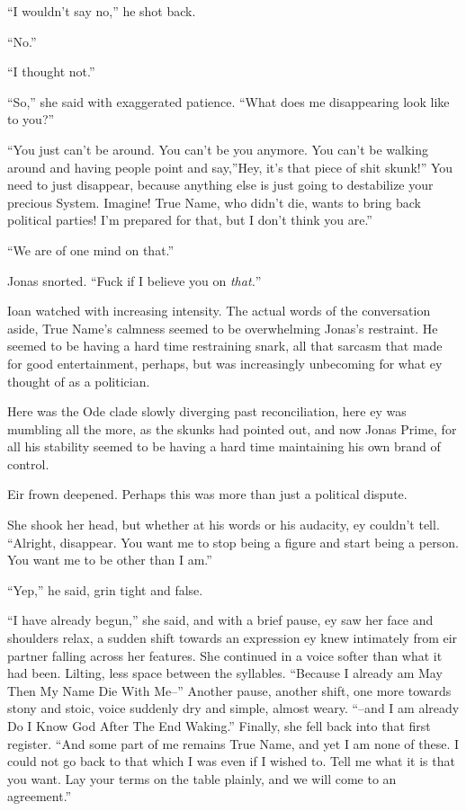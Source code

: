 ``I wouldn't say no,'' he shot back.

``No.''

``I thought not.''

``So,'' she said with exaggerated patience. ``What does me disappearing look like to you?''

``You just can't be around. You can't be you anymore. You can't be walking around and having people point and say,''Hey, it's that piece of shit skunk!'' You need to just disappear, because anything else is just going to destabilize your precious System. Imagine! True Name, who didn't die, wants to bring back political parties! I'm prepared for that, but I don't think you are.''

``We are of one mind on that.''

Jonas snorted. ``Fuck if I believe you on \emph{that.}''

Ioan watched with increasing intensity. The actual words of the conversation aside, True Name's calmness seemed to be overwhelming Jonas's restraint. He seemed to be having a hard time restraining snark, all that sarcasm that made for good entertainment, perhaps, but was increasingly unbecoming for what ey thought of as a politician.

Here was the Ode clade slowly diverging past reconciliation, here ey was mumbling all the more, as the skunks had pointed out, and now Jonas Prime, for all his stability seemed to be having a hard time maintaining his own brand of control.

Eir frown deepened. Perhaps this was more than just a political dispute.

She shook her head, but whether at his words or his audacity, ey couldn't tell. ``Alright, disappear. You want me to stop being a figure and start being a person. You want me to be other than I am.''

``Yep,'' he said, grin tight and false.

``I have already begun,'' she said, and with a brief pause, ey saw her face and shoulders relax, a sudden shift towards an expression ey knew intimately from eir partner falling across her features. She continued in a voice softer than what it had been. Lilting, less space between the syllables. ``Because I already am May Then My Name Die With Me--'' Another pause, another shift, one more towards stony and stoic, voice suddenly dry and simple, almost weary. ``--and I am already Do I Know God After The End Waking.'' Finally, she fell back into that first register. ``And some part of me remains True Name, and yet I am none of these. I could not go back to that which I was even if I wished to. Tell me what it is that you want. Lay your terms on the table plainly, and we will come to an agreement.''

